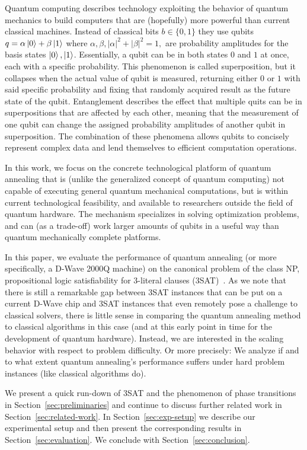 Quantum computing describes technology exploiting the behavior of quantum mechanics to build computers that are (hopefully) more powerful than current classical machines. Instead of classical bits $b \in \{0, 1\}$ they use qubits $q = \alpha\ket{0} + \beta\ket{1}$ where $\alpha, \beta, |\alpha|^2 + |\beta|^2 = 1,$ are probability amplitudes for the basis states $\ket{0}, \ket{1}$. Essentially, a qubit can be in both states $0$ and $1$ at once, each with a specific probability. This phenomenon is called superposition, but it collapses when the actual value of qubit is measured, returning either $0$ or $1$ with said specific probability and fixing that randomly acquired result as the future state of the qubit. Entanglement describes the effect that multiple quits can be in superpositions that are affected by each other, meaning that the measurement of one qubit can change the assigned probability amplitudes of another qubit in superposition. The combination of these phenomena allows qubits to concisely represent complex data and lend themselves to efficient computation operations.

In this work, we focus on the concrete technological platform of quantum annealing that is (unlike the generalized concept of quantum computing) not capable of executing general quantum mechanical computations, but is within current technological feasibility, and available to researchers outside the field of quantum hardware. The mechanism specializes in solving optimization problems, and can (as a trade-off) work larger amounts of qubits in a useful way than quantum mechanically complete platforms.

In this paper, we evaluate the performance of quantum annealing (or more specifically, a D-Wave 2000Q machine) on the canonical problem of the class NP, propositional logic satisfiability for 3-literal clauses (3SAT)~\cite{cook1971complexity}. As we note that there is still a remarkable gap between 3SAT instances that can be put on a current D-Wave chip and 3SAT instances that even remotely pose a challenge to classical solvers, there is little sense in comparing the quantum annealing method to classical algorithms in this case (and at this early point in time for the development of quantum hardware). Instead, we are interested in the scaling behavior with respect to problem difficulty. Or more precisely: We analyze if and to what extent quantum annealing's performance suffers under hard problem instances (like classical algorithms do).

We present a quick run-down of 3SAT and the phenomenon of phase transitions in Section~\ref{sec:preliminaries} and continue to discuss further related work in Section~\ref{sec:related-work}. In Section~\ref{sec:exp-setup} we describe our experimental setup and then present the corresponding results in Section~\ref{sec:evaluation}. We conclude with Section~\ref{sec:conclusion}.
